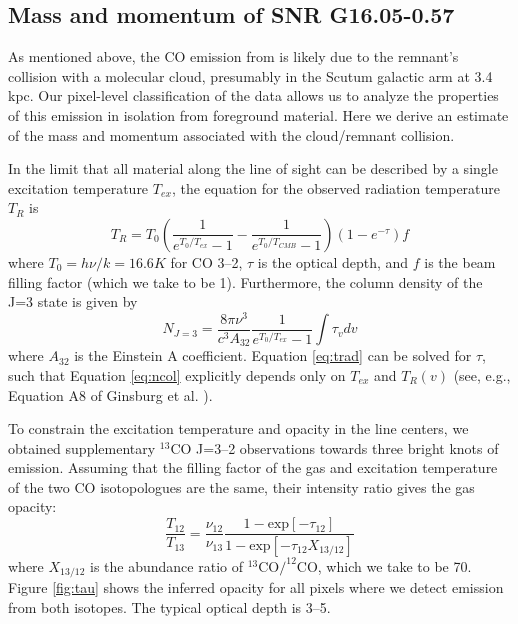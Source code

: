 \subsection{Mass and momentum of SNR G16.05-0.57}
As mentioned above, the CO emission from \snr{} is likely due to the remnant's collision with a molecular cloud, presumably in the Scutum galactic arm at 3.4 kpc. Our pixel-level classification of the data allows us to analyze the properties of this emission in isolation from foreground material. Here we derive an estimate of the mass and momentum associated with the cloud/remnant collision.

In the limit that all material along the line of sight can be described by a single excitation temperature $T_{ex}$, the equation for the observed radiation temperature $T_R$ is \citep{Ginsburg11}
\begin{equation}
T_R = T_0\left(\frac1{e^{T_0/T_{ex}}-1} - \frac1{e^{T_0/T_{CMB}} - 1} \right) \left(1-e^{-\tau} \right) f
\label{eq:trad}
\end{equation}
\noindent where $T_0 = h \nu / k = 16.6K$ for CO 3--2, $\tau$ is the optical depth, and $f$ is the beam filling factor (which we take to be 1). Furthermore,
the column density of the J=3 state is given by
\begin{equation}
N_{J=3} = \frac{8 \pi \nu^3}{c^3 A_{32}} \frac1{e^{T_0/T_{ex}} - 1} \int \tau_v dv
\label{eq:ncol}
\end{equation}
\noindent where $A_{32}$ is the Einstein A coefficient. Equation \ref{eq:trad} can be solved for $\tau$, such that Equation \ref{eq:ncol} explicitly depends only on $T_{ex}$ and $T_R(v)$ (see, e.g., Equation A8 of Ginsburg et al. \citeyear{Ginsburg11}).

To constrain the excitation temperature and opacity in the line centers, we obtained supplementary $^{13}$CO J=3--2 observations towards three bright knots of emission. Assuming that the filling factor of the gas and excitation temperature of the two CO isotopologues are the same, their intensity ratio gives the gas opacity:
\begin{equation}
\frac{T_{12}}{T_{13}} = \frac{\nu_{12}}{\nu_{13}} \frac{ 1 - \text{exp}[-\tau_{12}]}{1 - \text{exp}[-\tau_{12} X_{13/12}]}
\label{eq:tau}
\end{equation}
\noindent where $X_{13/12}$ is the abundance ratio of $^{13}\text{CO}/ ^{12}\text{CO}$, which we take to be 70. Figure \ref{fig:tau} shows the inferred opacity for all pixels where we detect emission from both isotopes. The typical optical depth is 3--5.

